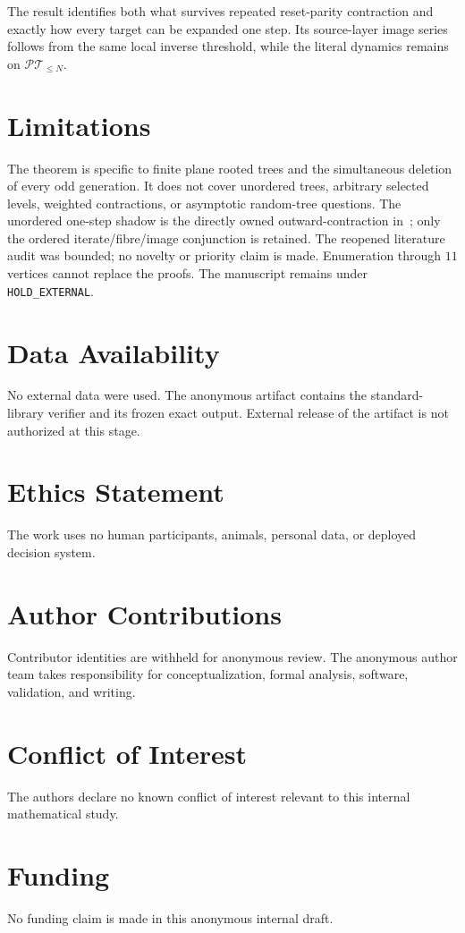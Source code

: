 \documentclass[a4paper,10pt]{amsart}
\theoremstyle{definition}
\theoremstyle{remark}
\newcommand{\PT}{\mathcal{PT}}
\begin{document}
The result identifies both what survives repeated reset-parity contraction
and exactly how every target can be expanded one step.  Its source-layer
image series follows from the same local inverse threshold, while the literal
dynamics remains on $\PT_{\le N}$.

\section*{Limitations}
The theorem is specific to finite plane rooted trees and the simultaneous
deletion of every odd generation.  It does not cover unordered trees,
arbitrary selected levels, weighted contractions, or asymptotic random-tree
questions.  The unordered one-step shadow is the directly owned
outward-contraction in~\cite{SooKhoussainovLinz2022}; only the ordered
iterate/fibre/image conjunction is retained.  The reopened literature audit
was bounded; no novelty or priority claim is made.  Enumeration through $11$
vertices cannot replace the proofs.  The manuscript remains under
\texttt{HOLD\_EXTERNAL}.

\section*{Data Availability}
No external data were used.  The anonymous artifact contains the
standard-library verifier and its frozen exact output.  External release of
the artifact is not authorized at this stage.

\section*{Ethics Statement}
The work uses no human participants, animals, personal data, or deployed
decision system.

\section*{Author Contributions}
Contributor identities are withheld for anonymous review.  The anonymous
author team takes responsibility for conceptualization, formal analysis,
software, validation, and writing.

\section*{Conflict of Interest}
The authors declare no known conflict of interest relevant to this internal
mathematical study.

\section*{Funding}
No funding claim is made in this anonymous internal draft.



\end{document}
